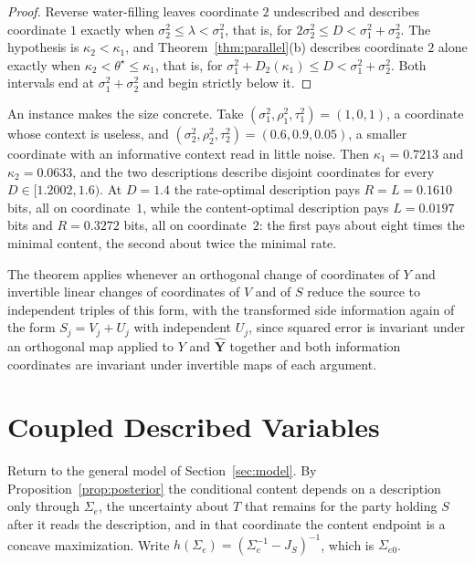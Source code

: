 \documentclass[11pt,onecolumn]{IEEEtran}
\newcommand{\hYv}{\hat{\mathbf Y}}
\begin{document}
\begin{proof}
Reverse water-filling leaves coordinate $2$ undescribed and describes
coordinate $1$ exactly when $\sigma_2^2\le\lambda<\sigma_1^2$, that is,
for $2\sigma_2^2\le D<\sigma_1^2+\sigma_2^2$. The hypothesis is
$\kappa_2<\kappa_1$, and Theorem~\ref{thm:parallel}(b) describes
coordinate $2$ alone exactly when $\kappa_2<\theta^\star\le\kappa_1$, that
is, for $\sigma_1^2+D_2(\kappa_1)\le D<\sigma_1^2+\sigma_2^2$. Both
intervals end at $\sigma_1^2+\sigma_2^2$ and begin strictly below it.
\end{proof}

An instance makes the size concrete. Take
$(\sigma_1^2,\rho_1^2,\tau_1^2)=(1,0,1)$, a coordinate whose context is
useless, and $(\sigma_2^2,\rho_2^2,\tau_2^2)=(0.6,0.9,0.05)$, a smaller
coordinate with an informative context read in little noise. Then
$\kappa_1=0.7213$ and $\kappa_2=0.0633$, and the two descriptions describe
disjoint coordinates for every $D\in[1.2002,1.6)$. At $D=1.4$ the
rate-optimal description pays $R=L=0.1610$ bits, all on coordinate~$1$,
while the content-optimal description pays $L=0.0197$ bits and
$R=0.3272$ bits, all on coordinate~$2$: the first pays about eight times
the minimal content, the second about twice the minimal rate.

The theorem applies whenever an orthogonal change of coordinates of $Y$
and invertible linear changes of coordinates of $V$ and of $S$ reduce the
source to independent triples of this form, with the transformed side
information again of the form $S_j=V_j+U_j$ with independent $U_j$, since squared error is
invariant under an orthogonal map applied to $Y$ and $\hYv$ together and
both information coordinates are invariant under invertible maps of each
argument.

\section{Coupled Described Variables}
\label{sec:coupled}

Return to the general model of Section~\ref{sec:model}. By
Proposition~\ref{prop:posterior} the conditional content depends on a
description only through $\Sigma_e$, the uncertainty about $T$ that
remains for the party holding $S$ after it reads the description, and in
that coordinate the content endpoint is a concave maximization. Write
$h(\Sigma_e)=(\Sigma_e^{-1}-J_S)^{-1}$, which is $\Sigma_{e0}$.
\end{document}
